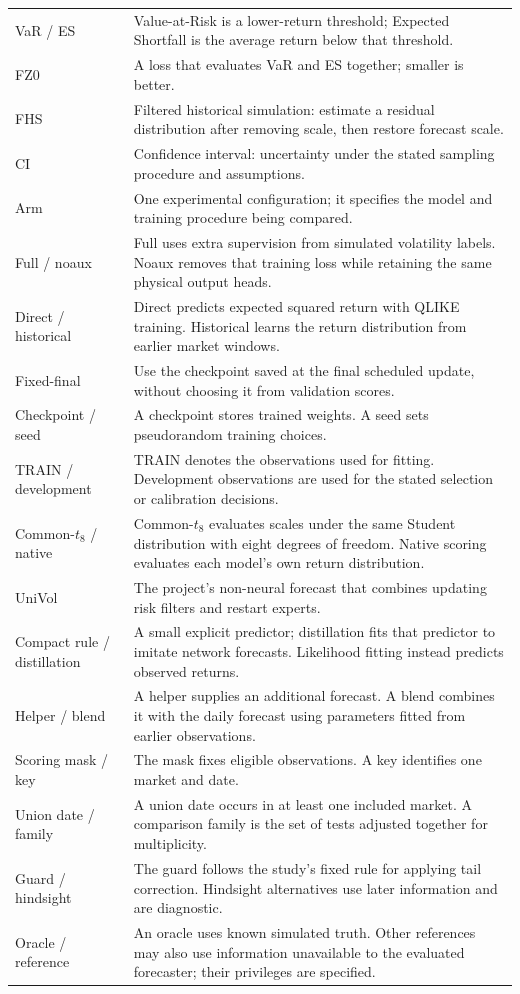 \begin{longtable}{@{}>{\raggedright\arraybackslash}p{2.7cm}>{\raggedright\arraybackslash}p{11.0cm}@{}}
VaR / ES & Value-at-Risk is a lower-return threshold; Expected Shortfall is the average return below that threshold. \\
FZ0 & A loss that evaluates VaR and ES together; smaller is better. \\
FHS & Filtered historical simulation: estimate a residual distribution after removing scale, then restore forecast scale. \\
CI & Confidence interval: uncertainty under the stated sampling procedure and assumptions. \\
Arm & One experimental configuration; it specifies the model and training procedure being compared. \\
Full / noaux & Full uses extra supervision from simulated volatility labels. Noaux removes that training loss while retaining the same physical output heads. \\
Direct / historical & Direct predicts expected squared return with QLIKE training. Historical learns the return distribution from earlier market windows. \\
Fixed-final & Use the checkpoint saved at the final scheduled update, without choosing it from validation scores. \\
Checkpoint / seed & A checkpoint stores trained weights. A seed sets pseudorandom training choices. \\
TRAIN / development & TRAIN denotes the observations used for fitting. Development observations are used for the stated selection or calibration decisions. \\
Common-$t_8$ / native & Common-$t_8$ evaluates scales under the same Student distribution with eight degrees of freedom. Native scoring evaluates each model's own return distribution. \\
UniVol & The project's non-neural forecast that combines updating risk filters and restart experts. \\
Compact rule / distillation & A small explicit predictor; distillation fits that predictor to imitate network forecasts. Likelihood fitting instead predicts observed returns. \\
Helper / blend & A helper supplies an additional forecast. A blend combines it with the daily forecast using parameters fitted from earlier observations. \\
Scoring mask / key & The mask fixes eligible observations. A key identifies one market and date. \\
Union date / family & A union date occurs in at least one included market. A comparison family is the set of tests adjusted together for multiplicity. \\
Guard / hindsight & The guard follows the study's fixed rule for applying tail correction. Hindsight alternatives use later information and are diagnostic. \\
Oracle / reference & An oracle uses known simulated truth. Other references may also use information unavailable to the evaluated forecaster; their privileges are specified. \\
\bottomrule
\end{longtable}
\endgroup

